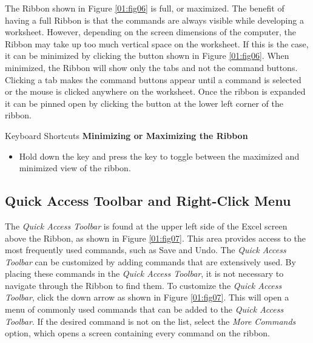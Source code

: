The Ribbon shown in Figure \ref{01:fig06} is full, or maximized. The benefit of having a full Ribbon is that the commands are always visible while developing a worksheet. However, depending on the screen dimensions of the computer, the Ribbon may take up too much vertical space on the worksheet. If this is the case, it can be minimized by clicking the button shown in Figure \ref{01:fig06}. When minimized, the Ribbon will show only the tabs and not the command buttons. Clicking a tab makes the command buttons appear until a command is selected or the mouse is clicked anywhere on the worksheet. Once the ribbon is expanded it can be pinned open by clicking the  button at the lower left corner of the ribbon.

\begin{center}
	\begin{shtcutbox}{Keyboard Shortcuts}
		\textbf{Minimizing or Maximizing the Ribbon}
		\\
		\begin{itemize}
			\setlength{\itemsep}{0pt}
			\setlength{\parskip}{0pt}
			\setlength{\parsep}{0pt}
			
			\item Hold down the  key and press the  key to toggle between the maximized and minimized view of the ribbon.
			
		\end{itemize}
	\end{shtcutbox}
\end{center}

\subsection{Quick Access Toolbar and Right-Click Menu}

The \textit{Quick Access Toolbar} is found at the upper left side of the Excel screen above the Ribbon, as shown in Figure \ref{01:fig07}. This area provides access to the most frequently used commands, such as Save and Undo. The \textit{Quick Access Toolbar} can be customized by adding commands that are extensively used. By placing these commands in the \textit{Quick Access Toolbar}, it is not necessary to navigate through the Ribbon to find them. To customize the \textit{Quick Access Toolbar}, click the down arrow as shown in Figure \ref{01:fig07}. This will open a menu of commonly used commands that can be added to the \textit{Quick Access Toolbar}. If the desired command is not on the list, select the \textit{More Commands} option, which opens a screen containing every command on the ribbon.


